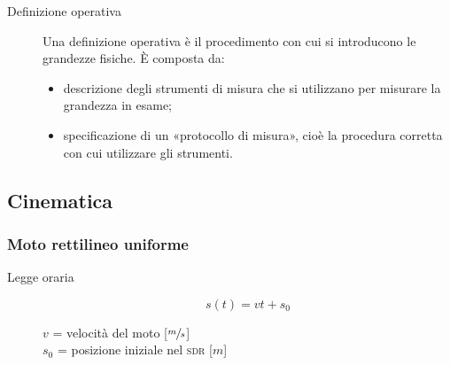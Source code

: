 \documentclass[a4paper,11pt,italian]{article}
\begin{document}
\begin{description}
  \item[Definizione operativa] 
  Una definizione operativa è il procedimento con cui si introducono le grandezze fisiche. È composta da:
  \begin{itemize}
    \item descrizione degli strumenti di misura che si utilizzano per misurare la grandezza in esame; 
    \item specificazione di un «protocollo di misura», cioè la procedura corretta con cui utilizzare gli strumenti.
  \end{itemize}
\end{description}



\subsection{Cinematica}
\subsubsection{Moto rettilineo uniforme}
\begin{description}
  \item[Legge oraria] 
  \[ s(t) = v  t + s_0 \]
  \begin{multicols}{2}
  $ v $ = velocità del moto [$ \sfrac{m}{s} $]\\
  $ s_0 $ = posizione iniziale nel \textsc{sdr} [$ m $]
  \end{multicols}
\end{description}
\end{document}
